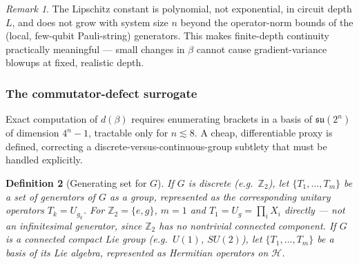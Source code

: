 \documentclass[10pt,twocolumn]{article}
\newtheorem{definition}{Definition}[section]
\theoremstyle{remark}
\newtheorem{remark}[definition]{Remark}
\newcommand{\Hil}{\mathcal{H}}
\newcommand{\su}[1]{\mathfrak{su}(#1)}
\begin{document}
\begin{remark}
\label{rem:polynomial}
The Lipschitz constant is polynomial, not exponential, in circuit depth $L$, and does not grow with system size $n$ beyond the operator-norm bounds of the (local, few-qubit Pauli-string) generators. This makes finite-depth continuity practically meaningful --- small changes in $\beta$ cannot cause gradient-variance blowups at fixed, realistic depth.
\end{remark}

\subsubsection{The commutator-defect surrogate}
\label{sec:defect}

Exact computation of $d(\beta)$ requires enumerating brackets in a basis of $\su{2^n}$ of dimension $4^n - 1$, tractable only for $n \lesssim 8$. A cheap, differentiable proxy is defined, correcting a discrete-versus-continuous-group subtlety that must be handled explicitly.

\begin{definition}[Generating set for $G$]
\label{def:genset}
If $G$ is discrete (e.g.\ $\mathbb{Z}_2$), let $\{T_1,\ldots,T_m\}$ be a set of generators of $G$ as a group, represented as the corresponding unitary operators $T_k = U_{g_k}$. For $\mathbb{Z}_2 = \{e,g\}$, $m=1$ and $T_1 = U_g = \prod_i X_i$ directly — not an infinitesimal generator, since $\mathbb{Z}_2$ has no nontrivial connected component. If $G$ is a connected compact Lie group (e.g.\ $U(1)$, $SU(2)$), let $\{T_1,\ldots,T_m\}$ be a basis of its Lie algebra, represented as Hermitian operators on $\Hil$.
\end{definition}
\end{document}
